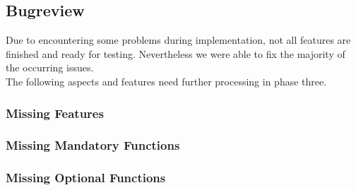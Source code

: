 \subsection{Bugreview}
Due to encountering some problems during implementation, not all features are finished and ready for testing.
Nevertheless we were able to fix the majority of the occurring issues. \\ 
The following aspects and features need further processing in phase three. 

\subsubsection{Missing Features}

\subsubsection{Missing Mandatory Functions}

\subsubsection{Missing Optional Functions}